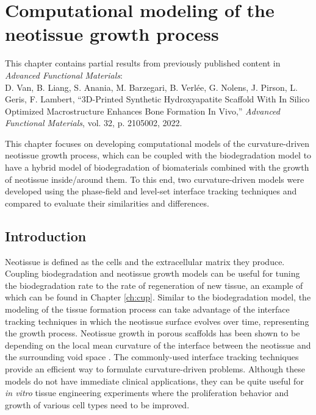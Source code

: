 \chapter{Computational modeling of the neotissue growth process}\label{ch:tissue}

\begin{tcolorbox}
This chapter contains partial results from previously published content in \textit{Advanced Functional Materials}:\\
D. Van, B. Liang, S. Anania, M. Barzegari, B. Verlée, G. Nolens, J. Pirson, L. Geris, F. Lambert, ``3D-Printed Synthetic Hydroxyapatite Scaffold With In Silico Optimized Macrostructure Enhances Bone Formation In Vivo,'' \textit{Advanced Functional Materials}, vol. 32, p. 2105002, 2022.
\end{tcolorbox}

This chapter focuses on developing computational models of the curvature-driven neotissue growth process, which can be coupled with the biodegradation model to have a hybrid model of biodegradation of biomaterials combined with the growth of neotissue inside/around them. To this end, two curvature-driven models were developed using the phase-field and level-set interface tracking techniques and compared to evaluate their similarities and differences.

\section{Introduction}

Neotissue is defined as the cells and the extracellular matrix they produce. Coupling biodegradation and neotissue growth models can be useful for tuning the biodegradation rate to the rate of regeneration of new tissue, an example of which can be found in Chapter \ref{ch:cup}. Similar to the biodegradation model, the modeling of the tissue formation process can take advantage of the interface tracking techniques in which the neotissue surface evolves over time, representing the growth process. Neotissue growth in porous scaffolds has been shown to be depending on the local mean curvature of the interface between the neotissue and the surrounding void space \cite{Bidan2012, Bidan2012a, Rumpler2008}. The commonly-used interface tracking techniques provide an efficient way to formulate curvature-driven problems. Although these models do not have immediate clinical applications, they can be quite useful for \textit{in vitro} tissue engineering experiments where the proliferation behavior and growth of various cell types need to be improved.

